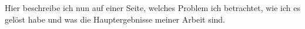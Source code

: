 \begin{center} 
    \huge {}
\end{center}


Hier beschreibe ich nun auf einer Seite, welches Problem ich betrachtet, wie ich es gelöst habe
und was die Hauptergebnisse meiner Arbeit sind.
